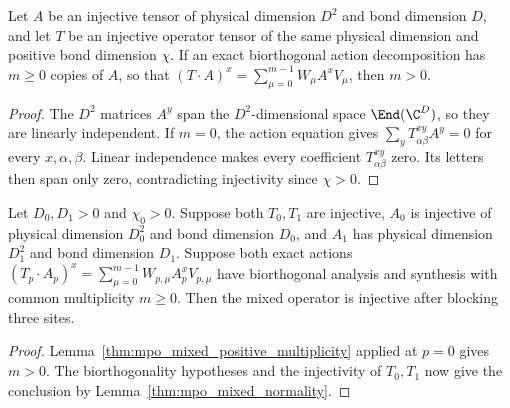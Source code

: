 \begin{lemma}
    \label{thm:mpo_mixed_positive_multiplicity}
    \leanok
    Let $A$ be an injective tensor of physical dimension $D^2$ and
    bond dimension $D$, and let $T$ be an injective operator tensor
    of the same physical dimension and positive bond dimension $\chi$.
    If an exact biorthogonal action decomposition has $m\geq0$ copies
    of $A$, so that $(T\cdot A)^x=\sum_{\mu=0}^{m-1}W_\mu A^xV_\mu$,
    then $m>0$.
\end{lemma}
\begin{proof}
    \leanok
    The $D^2$ matrices $A^y$ span the $D^2$-dimensional space
    $\End(\C^D)$, so they are linearly independent. If $m=0$, the
    action equation gives $\sum_y T^{xy}_{\alpha\beta}A^y=0$ for
    every $x,\alpha,\beta$. Linear independence makes every
    coefficient $T^{xy}_{\alpha\beta}$ zero. Its letters then span
    only zero, contradicting injectivity since $\chi>0$.
\end{proof}

\begin{lemma}
    \label{thm:mpo_mixed_normality_exact_action}
    \leanok
    Let $D_0,D_1>0$ and $\chi_0>0$. Suppose both $T_0,T_1$ are
    injective, $A_0$ is injective of physical dimension $D_0^2$ and
    bond dimension $D_0$, and $A_1$ has physical dimension $D_1^2$
    and bond dimension $D_1$. Suppose both exact actions
    $(T_p\cdot A_p)^x=\sum_{\mu=0}^{m-1}W_{p,\mu}A_p^xV_{p,\mu}$
    have biorthogonal analysis and synthesis with common multiplicity
    $m\geq0$. Then the mixed operator is injective after blocking
    three sites.
\end{lemma}
\begin{proof}
    \leanok
    Lemma~\ref{thm:mpo_mixed_positive_multiplicity} applied at $p=0$
    gives $m>0$. The biorthogonality hypotheses and the injectivity
    of $T_0,T_1$ now give the conclusion by
    Lemma~\ref{thm:mpo_mixed_normality}.
\end{proof}

